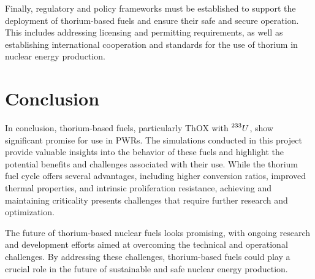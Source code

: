 Finally, regulatory and policy frameworks must be established to support the deployment of thorium-based fuels and ensure their safe and secure operation. This includes addressing licensing and permitting requirements, as well as establishing international cooperation and standards for the use of thorium in nuclear energy production.

\section{Conclusion}

In conclusion, thorium-based fuels, particularly ThOX with \(\prescript{233}{}{U}\), show significant promise for use in PWRs. The simulations conducted in this project provide valuable insights into the behavior of these fuels and highlight the potential benefits and challenges associated with their use. While the thorium fuel cycle offers several advantages, including higher conversion ratios, improved thermal properties, and intrinsic proliferation resistance, achieving and maintaining criticality presents challenges that require further research and optimization.

The future of thorium-based nuclear fuels looks promising, with ongoing research and development efforts aimed at overcoming the technical and operational challenges. By addressing these challenges, thorium-based fuels could play a crucial role in the future of sustainable and safe nuclear energy production.